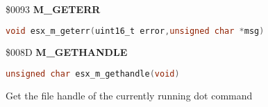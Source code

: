 \$0093 \textbf{M\_GETERR}

\begin{lstlisting}[language=C]
void esx_m_geterr(uint16_t error,unsigned char *msg)
\end{lstlisting}

%
%

\$008D \textbf{M\_GETHANDLE}

\begin{lstlisting}[language=C]
unsigned char esx_m_gethandle(void)
\end{lstlisting}

Get the file handle of the currently running dot command

%

